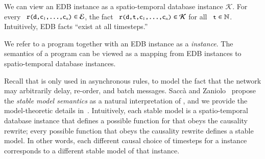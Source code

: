 We can view an EDB instance as a spatio-temporal database instance $\mathcal{K}$.  For every $\dedalus{r(d,c\sub{1},\ldots,c\sub{n})} \in \mathcal{E}$, the fact \linebreak $\dedalus{r(d,t,c\sub{1},\ldots,c\sub{n})} \in \mathcal{K}$ for all $\dedalus{t} \in \mathbb{N}$.  Intuitively, EDB facts ``exist at all timesteps.''


We refer to a \lang program together with an EDB instance as a {\em \lang instance}.  The semantics of a \lang program can be viewed as a mapping from EDB instances to spatio-temporal database instances.

Recall that  is only used in asynchronous rules, to model the fact that the network may arbitrarily delay, re-order, and batch messages.
Sacc\`{a} and Zaniolo~\cite{sacca-zaniolo} propose the {\em stable model semantics} as a natural interpretation of , and we provide the model-theoretic details in~\cite{ameloot-operational}.  Intuitively, each stable model is a spatio-temporal database instance that defines a possible function for  that obeys the causality rewrite; every possible function that obeys the causality rewrite defines a stable model.  %
In other words, each different causal choice of timesteps for a \lang instance corresponds to a different stable model of that instance.

